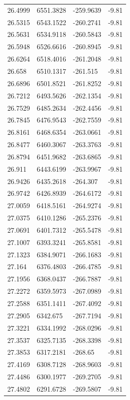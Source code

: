 \begin{table}[H]
\begin{tabular}{llll}
26.4999 & 6551.3828 & -259.9639 & -9.81 \\
26.5315 & 6543.1522 & -260.2741 & -9.81 \\
26.5631 & 6534.9118 & -260.5843 & -9.81 \\
26.5948 & 6526.6616 & -260.8945 & -9.81 \\
26.6264 & 6518.4016 & -261.2048 & -9.81 \\
26.658 & 6510.1317 & -261.515 & -9.81 \\
26.6896 & 6501.8521 & -261.8252 & -9.81 \\
26.7212 & 6493.5626 & -262.1354 & -9.81 \\
26.7529 & 6485.2634 & -262.4456 & -9.81 \\
26.7845 & 6476.9543 & -262.7559 & -9.81 \\
26.8161 & 6468.6354 & -263.0661 & -9.81 \\
26.8477 & 6460.3067 & -263.3763 & -9.81 \\
26.8794 & 6451.9682 & -263.6865 & -9.81 \\
26.911 & 6443.6199 & -263.9967 & -9.81 \\
26.9426 & 6435.2618 & -264.307 & -9.81 \\
26.9742 & 6426.8939 & -264.6172 & -9.81 \\
27.0059 & 6418.5161 & -264.9274 & -9.81 \\
27.0375 & 6410.1286 & -265.2376 & -9.81 \\
27.0691 & 6401.7312 & -265.5478 & -9.81 \\
27.1007 & 6393.3241 & -265.8581 & -9.81 \\
27.1323 & 6384.9071 & -266.1683 & -9.81 \\
27.164 & 6376.4803 & -266.4785 & -9.81 \\
27.1956 & 6368.0437 & -266.7887 & -9.81 \\
27.2272 & 6359.5973 & -267.0989 & -9.81 \\
27.2588 & 6351.1411 & -267.4092 & -9.81 \\
27.2905 & 6342.675 & -267.7194 & -9.81 \\
27.3221 & 6334.1992 & -268.0296 & -9.81 \\
27.3537 & 6325.7135 & -268.3398 & -9.81 \\
27.3853 & 6317.2181 & -268.65 & -9.81 \\
27.4169 & 6308.7128 & -268.9603 & -9.81 \\
27.4486 & 6300.1977 & -269.2705 & -9.81 \\
27.4802 & 6291.6728 & -269.5807 & -9.81 \\

\end{tabular}
\end{table}
